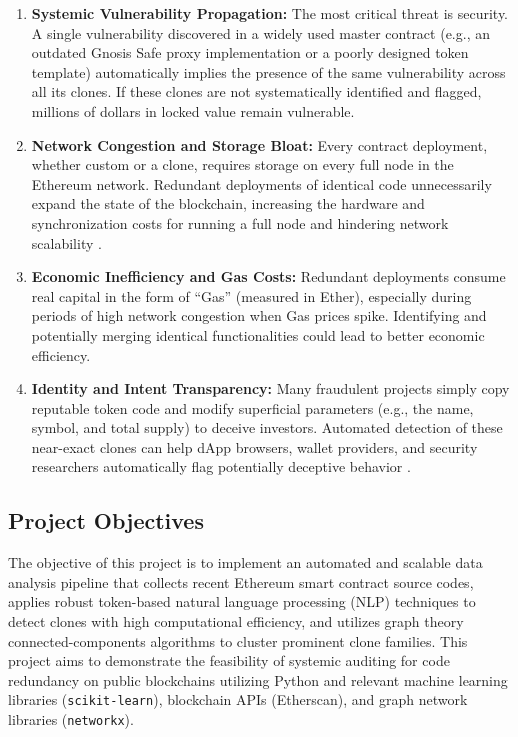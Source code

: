 \documentclass[12pt,a4paper]{article}
\begin{document}
\begin{enumerate}
    \item \textbf{Systemic Vulnerability Propagation:} The most critical threat is security. A single vulnerability discovered in a widely used master contract (e.g., an outdated Gnosis Safe proxy implementation or a poorly designed token template) automatically implies the presence of the same vulnerability across all its clones. If these clones are not systematically identified and flagged, millions of dollars in locked value remain vulnerable. 
    \item \textbf{Network Congestion and Storage Bloat:} Every contract deployment, whether custom or a clone, requires storage on every full node in the Ethereum network. Redundant deployments of identical code unnecessarily expand the state of the blockchain, increasing the hardware and synchronization costs for running a full node and hindering network scalability \cite{wang2021understanding}.
    \item \textbf{Economic Inefficiency and Gas Costs:} Redundant deployments consume real capital in the form of ``Gas'' (measured in Ether), especially during periods of high network congestion when Gas prices spike. Identifying and potentially merging identical functionalities could lead to better economic efficiency.
    \item \textbf{Identity and Intent Transparency:} Many fraudulent projects simply copy reputable token code and modify superficial parameters (e.g., the name, symbol, and total supply) to deceive investors. Automated detection of these near-exact clones can help dApp browsers, wallet providers, and security researchers automatically flag potentially deceptive behavior \cite{liu2019ethain}.
\end{enumerate}

\subsection{Project Objectives}
The objective of this project is to implement an automated and scalable data analysis pipeline that collects recent Ethereum smart contract source codes, applies robust token-based natural language processing (NLP) techniques to detect clones with high computational efficiency, and utilizes graph theory connected-components algorithms to cluster prominent clone families. This project aims to demonstrate the feasibility of systemic auditing for code redundancy on public blockchains utilizing Python and relevant machine learning libraries (\texttt{scikit-learn}), blockchain APIs (Etherscan), and graph network libraries (\texttt{networkx}).
\end{document}

